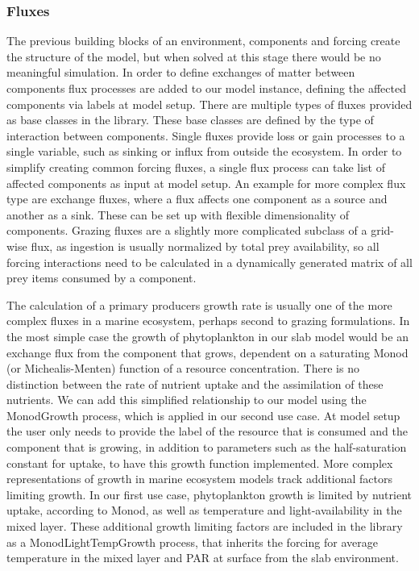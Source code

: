 \subsubsection{Fluxes}
The previous building blocks of an environment, components and forcing create the structure of the model, but when solved at this stage there would be no meaningful simulation. In order to define exchanges of matter between components flux processes are added to our model instance, defining the affected components via labels at model setup.
There are multiple types of fluxes provided as base classes in the library. These base classes are defined by the type of interaction between components. Single fluxes provide loss or gain processes to a single variable, such as sinking or influx from outside the ecosystem. In order to simplify creating common forcing fluxes, a single flux process can take list of affected components as input at model setup. An example for more complex flux type are exchange fluxes, where a flux affects one component as a source and another as a sink. These can be set up with flexible dimensionality of components. Grazing fluxes are a slightly more complicated subclass of a grid-wise flux, as ingestion is usually normalized by total prey availability, so all forcing interactions need to be calculated in a dynamically generated matrix of all prey items consumed by a component.

The calculation of a primary producers growth rate is usually one of the more complex fluxes in a marine ecosystem, perhaps second to grazing formulations. In the most simple case the growth of phytoplankton in our slab model would be an exchange flux from the component that grows, dependent on a saturating Monod (or Michealis-Menten) function of a resource concentration. There is no distinction between the rate of nutrient uptake and the assimilation of these nutrients. We can add this simplified relationship to our model using the MonodGrowth process, which is applied in our second use case. At model setup the user only needs to provide the label of the resource that is consumed and the component that is growing, in addition to parameters such as the half-saturation constant for uptake, to have this growth function implemented.
More complex representations of growth in marine ecosystem models track additional factors limiting growth. In our first use case, phytoplankton growth is limited by nutrient uptake, according to Monod, as well as temperature and light-availability in the mixed layer. These additional growth limiting factors are included in the library as a MonodLightTempGrowth process, that inherits the forcing for average temperature in the mixed layer and PAR at surface from the slab environment.